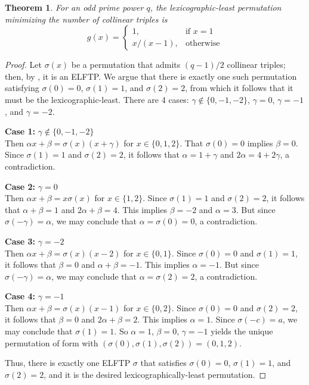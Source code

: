\documentclass[12pt]{article}
\newtheorem{theorem}{Theorem}
\begin{document}
 
\begin{theorem}\label{thm:lexleast}
For an odd prime power $q$, the lexicographic-least permutation minimizing the number of collinear triples is
\[
g(x)=\begin{cases}
		1, & \text{if $x=1$}\\
            x/(x-1), & \text{otherwise}
		 \end{cases}
\]
\end{theorem}

\begin{proof}
    Let $\sigma(x)$ be a permutation that admits $(q-1)/2$ collinear triples; then, by , it is an ELFTP. We argue that there is exactly one such permutation satisfying $\sigma(0)=0$, $\sigma(1)=1$, and $\sigma(2)=2$, from which it follows that it must be the lexicographic-least. There are 4 cases: $\gamma\notin\{0,-1,-2\}$, $\gamma =0$, $\gamma =-1$, and $\gamma =-2$.

    \textbf{Case 1:} $\gamma \notin\{0,-1,-2\}$\\
    Then $\alpha x+\beta=\sigma(x)(x+\gamma )$ for $x \in \{0,1,2\}$. That $\sigma(0)=0$ implies $\beta =0$. Since $\sigma(1)=1$ and $\sigma(2)=2$, it follows that $\alpha =1+\gamma $ and $2\alpha=4+2\gamma$, a contradiction.

    \textbf{Case 2:} $\gamma =0$\\
    Then $\alpha x+\beta = x\sigma(x)$ for $x \in \{1,2\}$. Since $\sigma(1)=1$ and $\sigma(2)=2$, it follows that $\alpha +\beta=1$ and $2\alpha+\beta=4$. This implies $\beta =-2$ and $\alpha =3$. But since $\sigma(-\gamma)=\alpha$, we may conclude that $\alpha =\sigma(0)=0$, a contradiction.

    \textbf{Case 3:} $\gamma =-2$\\
    Then $\alpha x+\beta = \sigma(x)(x-2)$ for $x \in \{0,1\}$. Since $\sigma(0)=0$ and $\sigma(1)=1$, it follows that $\beta =0$ and $\alpha +\beta=-1$. This implies $\alpha =-1$. But since $\sigma(-\gamma)=\alpha$, we may conclude that $\alpha =\sigma(2)=2$, a contradiction.

    \textbf{Case 4:} $\gamma =-1$\\
    Then $\alpha x+\beta = \sigma(x)(x-1)$ for $x \in \{0,2\}$. Since $\sigma(0)=0$ and $\sigma(2)=2$, it follows that $\beta =0$ and $2\alpha+\beta=2$. This implies $\alpha =1$. Since $\sigma(-c)=a$, we may conclude that $\sigma(1)=1$. So $\alpha =1$, $\beta =0$, $\gamma =-1$ yields the unique permutation of form  with $(\sigma(0),\sigma(1),\sigma(2))=(0,1,2)$.

    Thus, there is exactly one ELFTP $\sigma$ that satisfies $\sigma(0)=0$, $\sigma(1)=1$, and $\sigma(2)=2$, and it is the desired lexicographically-least permutation.
\end{proof}
\end{document}
